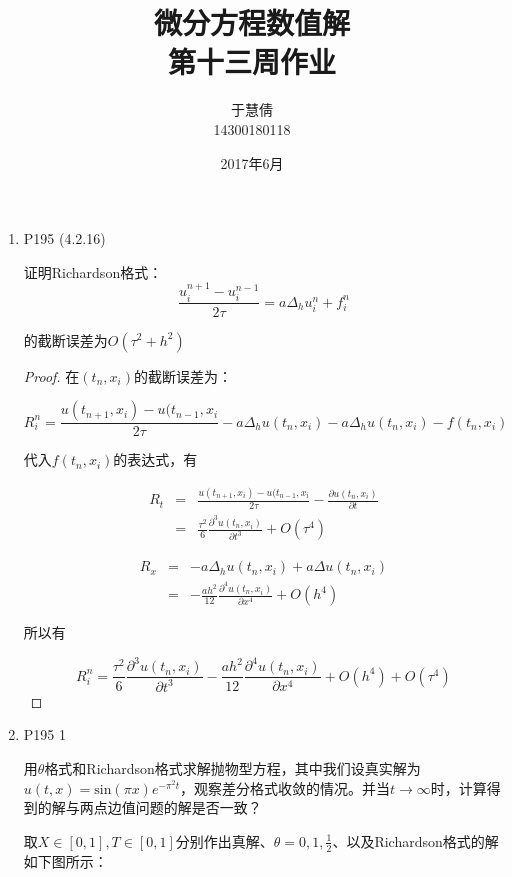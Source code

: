 \documentclass{ctexart}
\title{微分方程数值解 \\ 第十三周作业}
\author{于慧倩 \\ 14300180118}
\date{2017年6月}
\begin{document}
\maketitle

\newpage

\begin{enumerate}

\item P195 (4.2.16)

证明Richardson格式：
$$
\frac{u_i^{n+1}-u_i^{n-1}}{2 \tau} = a \Delta_h u_i^n+f_i^n
$$

的截断误差为$O(\tau^2+h^2)$

\begin{proof}

在$(t_n,x_i)$的截断误差为：

$$
R_i^n = \frac{u(t_{n+1},x_i)-u(t_{n-1},x_i}{2 \tau} - a \Delta_h u(t_n,x_i) -a\Delta_hu(t_n,x_i)-f(t_n,x_i)
$$

代入$f(t_n,x_i)$的表达式，有

\begin{eqnarray*}
R_t &=& \frac{u(t_{n+1},x_i)-u(t_{n-1},x_i}{2 \tau}-\frac{\partial u(t_n,x_i)}{\partial t} \\
&=& \frac{\tau^2}{6} \frac{\partial^3 u(t_n,x_i)}{\partial t^3} +O(\tau^4)
\end{eqnarray*}

\begin{eqnarray*}
R_x &=& -a\Delta_h u(t_n,x_i)+a\Delta u(t_n,x_i)\\
&=& -\frac{ah^2}{12}\frac{\partial^4 u(t_n,x_i)}{\partial x^4}+O(h^4)
\end{eqnarray*}

所以有

$$
R_i^n= \frac{\tau^2}{6} \frac{\partial^3 u(t_n,x_i)}{\partial t^3}  -\frac{ah^2}{12}\frac{\partial^4 u(t_n,x_i)}{\partial x^4}+O(h^4)+O(\tau^4)
$$


\end{proof}

\item P195 1

用$\theta$格式和Richardson格式求解抛物型方程，其中我们设真实解为$u(t,x)=\mbox{sin}(\pi x) e^{-\pi^2 t}$，观察差分格式收敛的情况。并当$t \rightarrow \infty$时，计算得到的解与两点边值问题的解是否一致？

取$X \in [0,1],T \in [0,1]$分别作出真解、$\theta=0,1,\frac{1}{2}$、以及Richardson格式的解如下图所示：


\end{enumerate}
\end{document}
